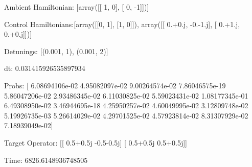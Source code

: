 \documentclass{article}
\begin{document}
    

\newpage

Ambient Hamiltonian: [array([[ 1,  0],
       [ 0, -1]])]

Control Hamiltonians:[array([[0, 1],
       [1, 0]]), array([[ 0.+0.j, -0.-1.j],
       [ 0.+1.j,  0.+0.j]])]

Detunings: [(0.001, 1), (0.001, 2)]

 dt: 0.031415926535897934

Probs: [  6.08694106e-02   4.95082097e-02   9.00264574e-02   7.86046575e-19
   5.86047206e-02   2.93486345e-02   6.11030825e-02   5.59023431e-02
   1.08177345e-01   6.49308950e-02   3.46944695e-18   4.25950257e-02
   4.60049995e-02   3.12809748e-02   5.19926735e-03   5.26614029e-02
   4.29701525e-02   4.57923814e-02   8.31307929e-02   7.18939049e-02]

Target Operator: [[ 0.5+0.5j -0.5-0.5j]
 [ 0.5+0.5j  0.5+0.5j]]

Time: 6826.6148936748505
\end{document}
